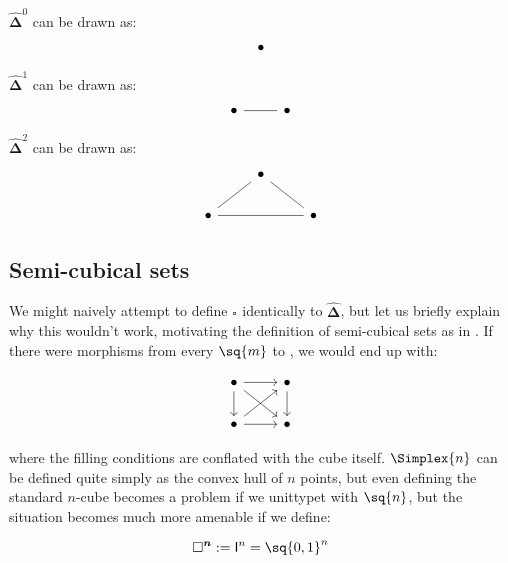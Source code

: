 \documentclass[10pt]{art.cls/art}
\newcommand{\DeltaHat}{\ensuremath{\hat{\boldsymbol{\Delta}}}}
\newcommand{\Cube}[1]{\ensuremath{\boldsymbol{\square^{#1}}}}
\renewcommand{\I}[1]{\ensuremath{\mathsf{I}^{#1}}}
\begin{document}
\begin{example}[$\DeltaHat^0$, $\DeltaHat^1$, $\DeltaHat^2$]
  $\DeltaHat^0$ can be drawn as:
  \begin{equation*}
    \begin{tikzcd}
      \bullet
    \end{tikzcd}
  \end{equation*}

  $\DeltaHat^1$ can be drawn as:
  \begin{equation*}
    \begin{tikzcd}
      \bullet \arrow[r, dash] & \bullet
    \end{tikzcd}
  \end{equation*}

  $\DeltaHat^2$ can be drawn as:
  \begin{equation*}
    \begin{tikzcd}
      & \bullet\arrow[dr, dash] & \\
      \bullet\arrow[rr, dash]\arrow[ur, dash] && \bullet
    \end{tikzcd}
  \end{equation*}
\end{example}

\subsection{Semi-cubical sets}
We might naively attempt to define $\Cube{}$ identically to \DeltaHat, but let us briefly explain why this wouldn't work, motivating the definition of semi-cubical sets as in \cite{Antolini00}. If there were morphisms from every $\sq{m}$ to , we would end up with:

$$
  \begin{tikzcd}
    \bullet \arrow[r] \arrow[dr] \arrow[d] & \bullet \arrow[d] \\
    \bullet \arrow[r] \arrow[ur] & \bullet
  \end{tikzcd}
$$

where the filling conditions are conflated with the cube itself. $\Simplex{n}$ can be defined quite simply as the convex hull of $n$ points, but even defining the standard $n$-cube becomes a problem if we unittypet with $\sq{n}$, but the situation becomes much more amenable if we define:

\begin{definition}[\Cube{n}]
  \begin{equation*}
    \Cube{n} := \I{n} = \sq{0, 1}^n
  \end{equation*}
\end{definition}
\end{document}

